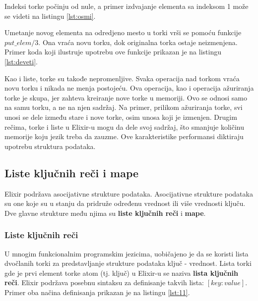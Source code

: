 \documentclass[12pt,oneside]{memoir}
\begin{document}


Indeksi torke počinju od nule, a primer izdvajanje elementa sa indeksom 1 može se videti na listingu \ref{lst:osmi}.



Umetanje novog elementa na odredjeno mesto u torki vrši se pomoću funkcije $put\_elem/3$. Ona vraća novu torku, dok originalna torka ostaje neizmenjena. Primer koda koji ilustruje upotrebu ove funkcije prikazan je na listingu \ref{lst:deveti}.



Kao i liste, torke su takođe nepromenljive. Svaka operacija nad torkom vraća novu torku i nikada ne menja postojeću. Ova operacija, kao i operacija ažuriranja torke je skupa, jer zahteva kreiranje nove torke u memoriji. Ovo se odnosi samo na samu torku, a ne na njen sadržaj. Na primer, prilikom ažuriranja torke, svi unosi se dele između stare i nove torke, osim unosa koji je izmenjen. Drugim rečima, torke i liste u Elixir-u mogu da dele svoj sadržaj, što smanjuje količinu memorije koju jezik treba da zauzme. Ove karakteristike performansi diktiraju upotrebu struktura podataka. 

\subsection{Liste ključnih reči i mape}
\label{odeljak:ključneReči}
Elixir podržava asocijativne strukture podataka. Asocijativne strukture podataka su one koje su u stanju da pridruže određenu vrednost ili više vrednosti ključu. Dve glavne strukture među njima su \textbf{liste ključnih reči} i \textbf{mape}.

\subsubsection{Liste ključnih reči}
U mnogim funkcionalnim programskim jezicima, uobičajeno je da se koristi lista dvočlanih torki za predstavljanje strukture podataka ključ - vrednost. Lista torki gde je prvi element torke atom (tj. ključ) u Elixir-u se naziva \textbf{lista ključnih reči}. Elixir podržava posebnu sintaksu za definisanje takvih lista: $[key: value]$. Primer oba načina definisanja prikazan je na listingu \ref{lst:11}.
\end{document}
